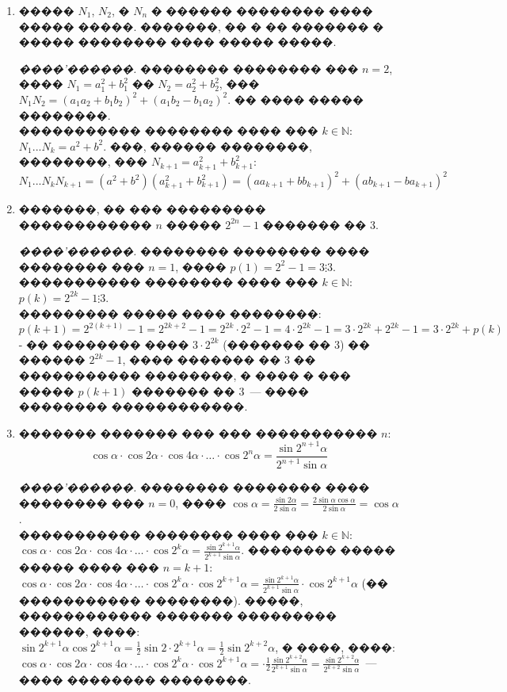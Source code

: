 \documentclass[a4paper,12pt]{article}
\begin{document}
\begin{enumerate}
\item ����� $N_{1}$, $N_{2}$, � $N_{n}$ � ������ �������� ���� ����� �����. �������, �� � �� ������� � ����� �������� ���� ����� �����.

\textit{����'������.} �������� �������� ��� $n=2$, ���� $N_{1}=a_{1}^{2}+b_{1}^{2}$ �� $N_{2}=a_{2}^{2}+b_{2}^{2}$, ��� $N_{1}N_{2}= (a_{1}a_{2}+b_{1}b_{2})^{2}+(a_{1}b_{2}-b_{1}a_{2})^{2}$. �� ���� ����� ��������. \\
����������� �������� ���� ��� $k\in \mathbb{N}$: $N_{1}...N_{k}=a^{2}+b^{2}$. ���, ������ ��������, ��������, ��� $N_{k+1}=a_{k+1}^{2}+b_{k+1}^{2}$: $N_{1}...N_{k}N_{k+1}=(a^{2}+b^{2})(a_{k+1}^{2}+b_{k+1}^{2})= (aa_{k+1}+bb_{k+1})^{2}+(ab_{k+1}-ba_{k+1})^{2}$


\item �������, �� ��� ��������� ������������ $n$ ����� $2^{2n}-1$ ������� �� 3.

\textit{����'������.} �������� �������� ���� �������� ��� $n=1$, ���� $p(1) = 2^{2}-1=3 \vdots 3$.\\
����������� �������� ���� ��� $k\in \mathbb{N}$: $p(k) = 2^{2k}-1 \vdots 3$.\\
��������� ����� ���� ��������: $p(k+1) = 2^{2(k+1)}-1=2^{2k+2}-1=2^{2k}\cdot 2^{2}-1=4\cdot  2^{2k}-1= 3\cdot 2^{2k}+ 2^{2k}-1 = 3\cdot 2^{2k} + p(k)$ - �� �������� ���� $3\cdot 2^{2k}$ (������� �� 3) �� ������ $2^{2k}-1$, ���� ������� �� 3 �� ����������� ��������, � ���� � ��� ����� $p(k+1)$ ������� �� 3~--- ���� �������� ������������.

\item ������� ������� ��� ��� ����������� $n$: $$\cos \alpha \cdot \cos 2\alpha\cdot \cos 4\alpha\cdot \ldots \cdot \cos 2^{n}\alpha = \frac{\sin 2^{n+1}\alpha}{2^{n+1}\sin \alpha}$$

\textit{����'������.} �������� �������� ���� �������� ��� $n=0$, ���� $\cos \alpha = \frac{\sin 2\alpha}{2\sin \alpha} = \frac{2\sin \alpha \cos \alpha}{2\sin \alpha} = \cos\alpha$. \\
����������� �������� ���� ��� $k\in \mathbb{N}$: $\cos \alpha \cdot \cos 2\alpha\cdot \cos 4\alpha\cdot \ldots \cdot \cos 2^{k}\alpha = \frac{\sin 2^{k+1}\alpha}{2^{k+1}\sin \alpha}$. �������� ����� ����� ���� ��� $n=k+1$: $\cos \alpha \cdot \cos 2\alpha\cdot \cos 4\alpha\cdot \ldots \cdot \cos 2^{k}\alpha \cdot \cos 2^{k+1}\alpha = \frac{\sin 2^{k+1}\alpha}{2^{k+1}\sin \alpha} \cdot \cos 2^{k+1}\alpha$ (�� ����������� ��������). �����, ������������ ������� ��������� ������, ����: $\sin 2^{k+1}\alpha \cos 2^{k+1}\alpha = \frac{1}{2} \sin 2\cdot 2^{k+1}\alpha = \frac{1}{2} \sin 2^{k+2}\alpha$, � ����, ����: $\cos \alpha \cdot \cos 2\alpha\cdot \cos 4\alpha\cdot \ldots \cdot \cos 2^{k}\alpha \cdot \cos 2^{k+1}\alpha = \cdot \frac{1}{2} \frac{\sin 2^{k+2}\alpha}{2^{k+1}\sin \alpha} = \frac{\sin 2^{k+2}\alpha}{2^{k+2}\sin \alpha}$~--- ���� �������� ��������.


\end{enumerate}
\end{document}
